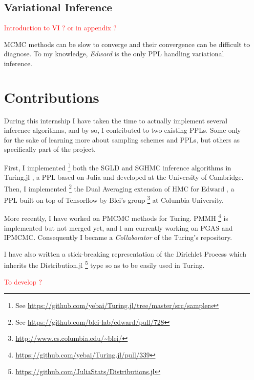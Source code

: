 \subsection{Variational Inference}
\textcolor{red}{Introduction to VI ? or in appendix ?}

MCMC methods can be slow to converge and their convergence can be difficult to diagnose.
To my knowledge, \emph{Edward} \cite{Edward} is the only \gls{PPL} handling variational inference.


\section{Contributions}
During this internship I have taken the time to actually implement several inference algorithms, and by so, I contributed to two existing \gls{PPL}s.
Some only for the sake of learning more about sampling schemes and \gls{PPL}s, but others as specifically part of the project. 

First, I implemented \footnote{See \url{https://github.com/yebai/Turing.jl/tree/master/src/samplers}} both the \gls{SGLD} and \gls{SGHMC} inference algorithms in Turing.jl \cite{Turing}, a \gls{PPL} based on Julia \cite{Bezanson:2017gd} and developed at the University of Cambridge.
Then, I implemented \footnote{See \url{https://github.com/blei-lab/edward/pull/728}} the Dual Averaging extension \cite{NUTS} of \gls{HMC} for Edward \cite{Edward}, a \gls{PPL} built on top of Tensorflow \cite{Tensorflow} by Blei's group \footnote{\url{http://www.cs.columbia.edu/~blei/}} at Columbia University.

More recently, I have worked on \gls{PMCMC} methods for Turing. \Gls{PMMH} \footnote{\url{https://github.com/yebai/Turing.jl/pull/339}} is implemented but not merged yet, and I am currently working on \gls{PGAS} and \gls{IPMCMC}. Consequently I became a \textit{Collaborator} of the Turing's repository.

I have also written a stick-breaking representation of the Dirichlet Process which inherits the Distribution.jl \footnote{\url{https://github.com/JuliaStats/Distributions.jl}} type so as to be easily used in Turing.

\textcolor{red}{To develop ?}
 

